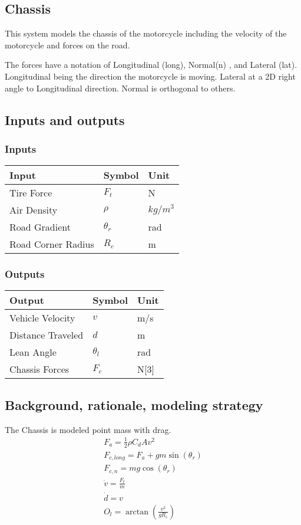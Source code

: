 \documentclass[../SimBALink.tex]{subfiles}
\begin{document}
\subsection{Chassis} This system models the chassis of the motorcycle including the velocity of the motorcycle and forces on the road.

The forces have a notation of Longitudinal (long), Normal(n) , and Lateral (lat). Longitudinal being the direction the motorcycle is moving. Lateral at a 2D right angle to Longitudinal direction. Normal is orthogonal to others. 

\subsection{Inputs and outputs}
	\subsubsection{Inputs}
	\begin{tabular}{ l | l | l  }
		Input					&	Symbol		&	Unit		\\	\hline
		Tire Force				& 	$F_t$ 		&	N \\		
		Air Density 			&	$\rho$		& $kg/m^3$ \\
		Road Gradient			&	$\theta_r$  & rad \\
		Road Corner Radius		&	$R_c$		& m
	\end{tabular}
	
	\subsubsection{Outputs}
	\begin{tabular}{ l | l | l  }
		Output					&	Symbol		&	Unit		\\	\hline
		Vehicle Velocity		&	$v$			&	m/s \\
		Distance Traveled		&	$d$			&	m \\
		Lean Angle 				&	$\theta_l$	&   rad	\\
		Chassis Forces			&	$F_c$		&	N[3]
	\end{tabular}

\subsection{Background, rationale, modeling strategy}
The Chassis is modeled point mass with drag.
\begin{gather}
		F_a = \frac{1}{2} \rho C_dAv^2 \\
		F_{c,long}  = F_a + gm\sin(\theta_r)  \\
		F_{c,n} = mg\cos(\theta_r) \\
		\dot{v} = \frac{F_t}{m} \\
		\dot{d} = v \\
		O_l = \arctan(\frac{v^2}{gR_c})
\end{gather}
\end{document}

